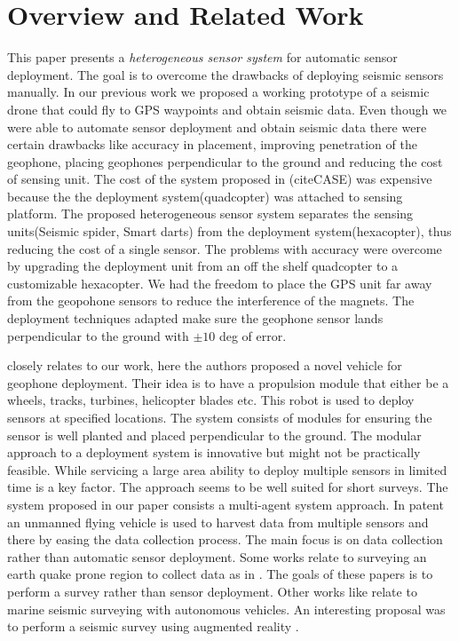 \section{Overview and Related Work}\label{sec:RelatedWork}

This paper presents a \emph{heterogeneous sensor system} for automatic sensor deployment. The goal is to overcome the drawbacks of deploying seismic sensors manually. In our previous work we proposed a working prototype of a seismic drone that could fly to GPS waypoints and obtain seismic data. Even though we were able to automate sensor deployment and obtain seismic data there were certain drawbacks like accuracy in placement, improving penetration of the geophone, placing geophones perpendicular to the ground and reducing the cost of sensing unit. The cost of the system proposed in (citeCASE) was expensive because the the deployment system(quadcopter) was attached to sensing platform.
The proposed heterogeneous sensor system separates the sensing units(Seismic spider, Smart darts) from the deployment system(hexacopter), thus reducing the cost of a single sensor. The problems with accuracy were overcome by upgrading the deployment unit from an off the shelf quadcopter to a customizable hexacopter. We had the freedom to place the GPS unit far away from the geopohone sensors to reduce the interference of the magnets. The deployment techniques adapted make sure the geophone sensor lands perpendicular to the ground with $\pm 10$ deg of error.

 \cite{postel2014drone} closely relates to our work, here the authors proposed a novel vehicle for geophone deployment. Their idea is to have a propulsion module that either be a wheels, tracks, turbines, helicopter blades etc. This robot is used to deploy sensors at specified locations. The system consists of modules for ensuring the sensor is well planted and placed perpendicular to the ground. The modular approach to a deployment system is innovative but might not be practically feasible. While servicing a large area ability to deploy multiple sensors in limited time is a key factor. The approach seems to be well suited for short surveys. The system proposed in our paper consists a multi-agent system approach.
In patent \cite{wilcox2013seismic} an unmanned flying vehicle is used to harvest data from multiple sensors and there by easing the data collection process. The main focus is on data collection rather than automatic sensor deployment.
Some works relate to surveying an earth quake prone region to collect data as in \cite{dominici2012micro}. The goals of these papers is to perform a survey rather than sensor deployment.
Other works like \cite{muyzert2015marine} relate to marine seismic surveying with autonomous vehicles. An interesting proposal was to perform a seismic survey using augmented reality \cite{jones2016seismic}.

